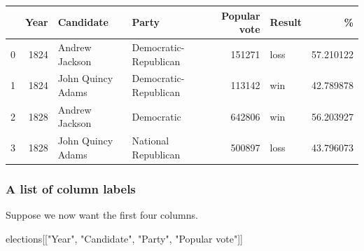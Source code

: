 \documentclass[
  letterpaper,
  DIV=11,
  numbers=noendperiod]{scrreprt}
\newenvironment{Shaded}{\begin{snugshade}}{\end{snugshade}}
\newcommand{\NormalTok}[1]{\textcolor[rgb]{0.00,0.23,0.31}{#1}}
\newcommand{\StringTok}[1]{\textcolor[rgb]{0.13,0.47,0.30}{#1}}
\begin{document}
\begin{tabular}{lrllrlr}
\toprule
{} &  Year &          Candidate &                  Party &  Popular vote & Result &          \% \\
\midrule
0 &  1824 &     Andrew Jackson &  Democratic-Republican &        151271 &   loss &  57.210122 \\
1 &  1824 &  John Quincy Adams &  Democratic-Republican &        113142 &    win &  42.789878 \\
2 &  1828 &     Andrew Jackson &             Democratic &        642806 &    win &  56.203927 \\
3 &  1828 &  John Quincy Adams &    National Republican &        500897 &   loss &  43.796073 \\
\bottomrule
\end{tabular}

\hypertarget{a-list-of-column-labels}{%
\subsubsection{A list of column labels}\label{a-list-of-column-labels}}

Suppose we now want the first four columns.

\begin{Shaded}
\begin{Highlighting}[]
\NormalTok{elections[[}\StringTok{"Year"}\NormalTok{, }\StringTok{"Candidate"}\NormalTok{, }\StringTok{"Party"}\NormalTok{, }\StringTok{"Popular vote"}\NormalTok{]]}
\end{Highlighting}
\end{Shaded}
\end{document}
